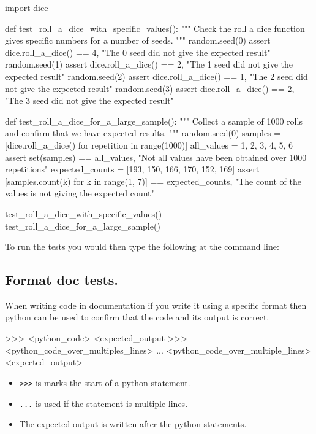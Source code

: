 \begin{python}
import dice


def test_roll_a_dice_with_specific_values():
    """
    Check the roll a dice function gives specific numbers for a number of seeds.
    """
    random.seed(0)
    assert dice.roll_a_dice() == 4, "The 0 seed did not give the expected result"
    random.seed(1)
    assert dice.roll_a_dice() == 2, "The 1 seed did not give the expected result"
    random.seed(2)
    assert dice.roll_a_dice() == 1, "The 2 seed did not give the expected result"
    random.seed(3)
    assert dice.roll_a_dice() == 2, "The 3 seed did not give the expected result"


def test_roll_a_dice_for_a_large_sample():
    """
    Collect a sample of 1000 rolls and confirm that we have expected results.
    """
    random.seed(0)
    samples = [dice.roll_a_dice() for repetition in range(1000)]
    all_values = {1, 2, 3, 4, 5, 6}
    assert set(samples) == all_values, "Not all values have been obtained over 1000 repetitions"
    expected_counts = [193, 150, 166, 170, 152, 169]
    assert [samples.count(k) for k in range(1, 7)] == expected_counts, "The count of the values is not giving the expected count"

test_roll_a_dice_with_specific_values()
test_roll_a_dice_for_a_large_sample()
\end{python}


To run the tests you would then type the following at the command line:



\subsection{Format doc tests.}

When writing code in documentation if you write it using a specific format then
python can be used to confirm that the code and its output is correct.


\begin{md}
>>> <python_code>
<expected_output
>>> <python_code_over_multiples_lines>
... <python_code_over_multiple_lines>
<expected_output>
\end{md}

\begin{itemize}
\item 

\texttt{>>>} is marks the start of a python statement.

\item 

\texttt{...} is used if the statement is multiple lines.

\item 

The expected output is written after the python statements.

\end{itemize}


